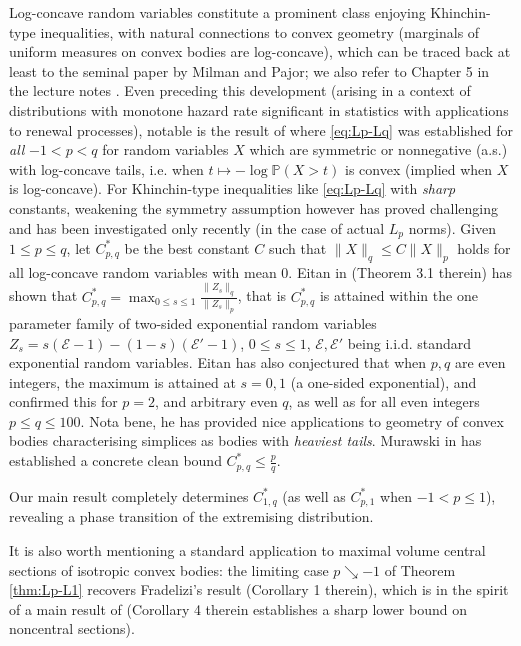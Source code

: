 \documentclass[10pt]{amsart}
\newcommand{\1}{\textbf{1}}
\newcommand{\p}[1]{\mathbb{P}\left( #1 \right)}
\newcommand{\red}{}
\newcommand{\cE}{\mathcal{E}}
\theoremstyle{remark}
\theoremstyle{definition}
\begin{document}
Log-concave random variables constitute a prominent class enjoying Khinchin-type inequalities, with natural connections to convex geometry (marginals of uniform measures on convex bodies are log-concave), which can be traced back at least to the {\red seminal} paper \cite{MP} by Milman and Pajor; we also refer to Chapter 5 in the lecture notes \cite{GNT}. Even preceding this development (arising in a context of distributions with monotone hazard rate significant in statistics with applications to renewal processes), notable is the result of \cite{BMP} where \eqref{eq:Lp-Lq} was established for \emph{all} $-1 < p < q$ for random variables $X$ which are symmetric or nonnegative (a.s.) with log-concave tails, i.e. when $t \mapsto -\log\p{X > t}$ is convex (implied when $X$ is log-concave). For Khinchin-type inequalities like \eqref{eq:Lp-Lq} with \emph{sharp} constants, weakening the symmetry assumption however has proved challenging and has been investigated only recently (in the case of actual $L_p$ norms). Given $1 \leq p \leq q$, let $C_{p,q}^*$ be the best constant $C$ such that $\|X\|_q \leq C\|X\|_p$ holds for all log-concave random variables with mean $0$. Eitan in \cite{Eitan} (Theorem 3.1 therein) {\red has shown} that $C_{p,q}^* = \max_{0 \leq s \leq 1}\frac{\|Z_s\|_q}{\|Z_s\|_p}$, that is $C_{p,q}^*$ is attained within the one parameter family of two-sided exponential random variables $Z_s = s(\cE-1) - (1-s)(\cE'-1)$, $0 \leq s \leq 1$, $\cE, \cE'$ being i.i.d. standard exponential random variables. Eitan has also conjectured that when $p, q$ are even integers, the maximum is attained at $s = 0, 1$ (a one-sided exponential), and confirmed this for $p=2$, and arbitrary even $q$, as well as for all even integers $p \leq q \leq 100$. Nota bene, he has provided nice applications to geometry of convex bodies characterising simplices as bodies with \emph{heaviest tails}. Murawski in \cite{Mur} has established a concrete clean bound $C_{p,q}^* \leq \frac{p}{q}$. 

Our main result completely determines $C_{1,q}^*$ (as well as $C_{p,1}^*$ when $-1 < p \leq 1$), revealing a phase transition of the extremising distribution. 

It is also worth mentioning a standard application to maximal volume central sections of isotropic convex bodies: the limiting case $p \searrow -1$ of Theorem \ref{thm:Lp-L1} recovers Fradelizi's result \cite{Fra} (Corollary 1 therein), which is in the spirit of a main result of \cite{MTW} (Corollary 4 therein establishes a sharp lower bound on noncentral sections). 
\end{document}
